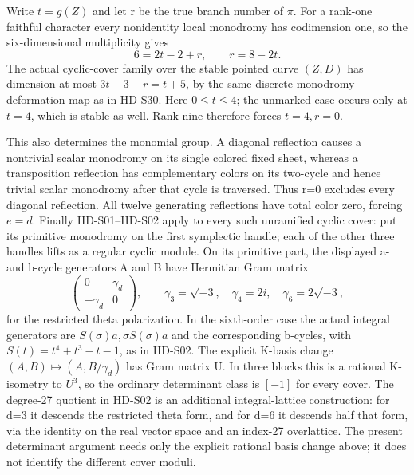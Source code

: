 Write \(t=g(Z)\) and let r be the true branch number of \(\pi\).
For a rank-one faithful character every nonidentity local monodromy
has codimension one, so the six-dimensional multiplicity gives
\[
                       6=2t-2+r,\qquad r=8-2t.
\]
The actual cyclic-cover family over the stable pointed curve
\((Z,D)\) has dimension at most
\(3t-3+r=t+5\), by the same discrete-monodromy deformation
map as in HD-S30. Here \(0\le t\le4\); the unmarked case
occurs only at \(t=4\), which is stable as well. Rank nine
therefore forces \(t=4,r=0\).

This also determines the monomial group. A diagonal reflection
causes a nontrivial scalar monodromy on its single colored fixed
sheet, whereas a transposition reflection has complementary colors
on its two-cycle and hence trivial scalar monodromy after that
cycle is traversed. Thus r=0 excludes every diagonal reflection.
All twelve generating reflections have total color zero, forcing
\(e=d\). Finally HD-S01--HD-S02 apply to every such unramified
cyclic cover: put its primitive monodromy on the first symplectic
handle; each of the other three handles lifts as a regular cyclic
module. On its primitive part, the displayed a- and b-cycle
generators A and B have Hermitian Gram matrix
\[
 \begin{pmatrix}0&\gamma_d\\-\gamma_d&0\end{pmatrix},
 \qquad\gamma_3=\sqrt{-3},\quad\gamma_4=2i,\quad
 \gamma_6=2\sqrt{-3},
\]
for the restricted theta polarization. In the sixth-order case the
actual integral generators are \(S(\sigma)a,\sigma S(\sigma)a\)
and the corresponding b-cycles, with
\(S(t)=t^4+t^3-t-1\), as in HD-S02. The explicit K-basis
change \((A,B)\mapsto(A,B/\gamma_d)\) has Gram matrix U.
In three blocks this is a rational K-isometry to \(U^3\), so
the ordinary determinant class is \([-1]\) for every cover.
The degree-27 quotient in HD-S02 is an additional integral-lattice
construction: for d=3 it descends the restricted theta form, and
for d=6 it descends half that form, via the identity on the real
vector space and an index-27 overlattice. The present determinant
argument needs only the explicit rational basis change above; it
does not identify the different cover moduli.

